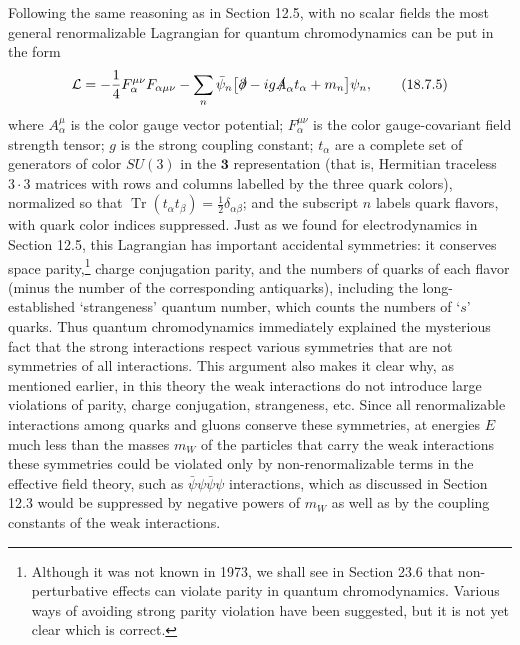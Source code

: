Following the same reasoning as in Section 12.5, with no scalar fields the most general renormalizable Lagrangian for quantum chromodynamics can be put in the form
\begin{equation}
\mathcal{L}=-\frac{1}{4}F^{\mu\nu}_{\alpha}F_{\alpha\mu\nu}
-\sum_n\bar\psi_n\bigl[\sl{\partial}-ig\sl{A}_\alpha t_\alpha+m_n\bigr]\psi_n,
\tag{18.7.5}\label{eq:18.7.5}
\end{equation}
where $A^\mu_\alpha$ is the color gauge vector potential; $F^{\mu\nu}_\alpha$ is the color gauge-covariant field strength tensor; $g$ is the strong coupling constant; $t_\alpha$ are a complete set of generators of color $SU(3)$ in the $\mathbf{3}$ representation (that is, Hermitian traceless $3\cdot3$ matrices with rows and columns labelled by the three quark colors), normalized so that $\operatorname{Tr}(t_\alpha t_\beta)=\frac{1}{2}\delta_{\alpha\beta}$; and the subscript $n$ labels quark flavors, with quark color indices suppressed. Just as we found for electrodynamics in Section 12.5, this Lagrangian has important accidental symmetries: it conserves space parity,\footnote{Although it was not known in 1973, we shall see in Section 23.6 that non-perturbative effects can violate parity in quantum chromodynamics. Various ways of avoiding strong parity violation have been suggested, but it is not yet clear which is correct.} charge conjugation parity, and the numbers of quarks of each flavor (minus the number of the corresponding antiquarks), including the long-established `strangeness' quantum number, which counts the numbers of `$s$' quarks. Thus quantum chromodynamics immediately explained the mysterious fact that the strong interactions respect various symmetries that are not symmetries of all interactions. This argument also makes it clear why, as mentioned earlier, in this theory the weak interactions do not introduce large violations of parity, charge conjugation, strangeness, etc. Since all renormalizable interactions among quarks and gluons conserve these symmetries, at energies $E$ much less than the masses $m_W$ of the particles that carry the weak interactions these symmetries could be violated only by non-renormalizable terms in the effective field theory, such as $\bar\psi\psi\bar\psi\psi$ interactions, which as discussed in Section 12.3 would be suppressed by negative powers of $m_W$ as well as by the coupling constants of the weak interactions.

